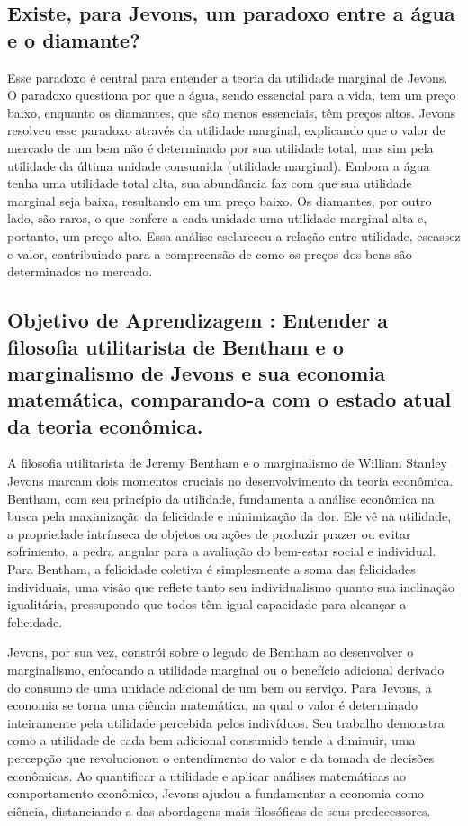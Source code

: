 \documentclass[a4paper,12pt]{article}[abntex2]
\begin{document}
\subsection{\textbf{Existe, para Jevons, um paradoxo entre a água e o diamante?}}
Esse paradoxo é central para entender a teoria da utilidade marginal de Jevons. O paradoxo questiona por que a água, sendo essencial para a vida, tem um preço baixo, enquanto os diamantes, que são menos essenciais, têm preços altos. Jevons resolveu esse paradoxo através da utilidade marginal, explicando que o valor de mercado de um bem não é determinado por sua utilidade total, mas sim pela utilidade da última unidade consumida (utilidade marginal). Embora a água tenha uma utilidade total alta, sua abundância faz com que sua utilidade marginal seja baixa, resultando em um preço baixo. Os diamantes, por outro lado, são raros, o que confere a cada unidade uma utilidade marginal alta e, portanto, um preço alto. Essa análise esclareceu a relação entre utilidade, escassez e valor, contribuindo para a compreensão de como os preços dos bens são determinados no mercado.
\subsection{\textbf{Objetivo de Aprendizagem : Entender a filosofia utilitarista de Bentham e o marginalismo de Jevons e sua economia matemática, comparando-a com o estado atual da teoria econômica.}}
A filosofia utilitarista de Jeremy Bentham e o marginalismo de William Stanley Jevons marcam dois momentos cruciais no desenvolvimento da teoria econômica. Bentham, com seu princípio da utilidade, fundamenta a análise econômica na busca pela maximização da felicidade e minimização da dor. Ele vê na utilidade, a propriedade intrínseca de objetos ou ações de produzir prazer ou evitar sofrimento, a pedra angular para a avaliação do bem-estar social e individual. Para Bentham, a felicidade coletiva é simplesmente a soma das felicidades individuais, uma visão que reflete tanto seu individualismo quanto sua inclinação igualitária, pressupondo que todos têm igual capacidade para alcançar a felicidade.

Jevons, por sua vez, constrói sobre o legado de Bentham ao desenvolver o marginalismo, enfocando a utilidade marginal ou o benefício adicional derivado do consumo de uma unidade adicional de um bem ou serviço. Para Jevons, a economia se torna uma ciência matemática, na qual o valor é determinado inteiramente pela utilidade percebida pelos indivíduos. Seu trabalho demonstra como a utilidade de cada bem adicional consumido tende a diminuir, uma percepção que revolucionou o entendimento do valor e da tomada de decisões econômicas. Ao quantificar a utilidade e aplicar análises matemáticas ao comportamento econômico, Jevons ajudou a fundamentar a economia como ciência, distanciando-a das abordagens mais filosóficas de seus predecessores.
\end{document}
